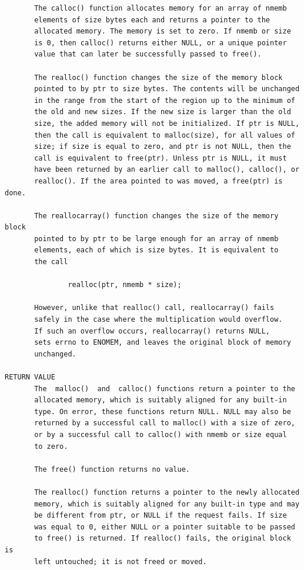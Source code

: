 {\begin{center}
\begin{verbatim}
       The calloc() function allocates memory for an array of nmemb
       elements of size bytes each and returns a pointer to the
       allocated memory. The memory is set to zero. If nmemb or size
       is 0, then calloc() returns either NULL, or a unique pointer
       value that can later be successfully passed to free().

       The realloc() function changes the size of the memory block
       pointed to by ptr to size bytes. The contents will be unchanged
       in the range from the start of the region up to the minimum of
       the old and new sizes. If the new size is larger than the old
       size, the added memory will not be initialized. If ptr is NULL,
       then the call is equivalent to malloc(size), for all values of
       size; if size is equal to zero, and ptr is not NULL, then the
       call is equivalent to free(ptr). Unless ptr is NULL, it must
       have been returned by an earlier call to malloc(), calloc(), or
       realloc(). If the area pointed to was moved, a free(ptr) is done.

       The reallocarray() function changes the size of the memory block
       pointed to by ptr to be large enough for an array of nmemb
       elements, each of which is size bytes. It is equivalent to
       the call

               realloc(ptr, nmemb * size);

       However, unlike that realloc() call, reallocarray() fails
       safely in the case where the multiplication would overflow.
       If such an overflow occurs, reallocarray() returns NULL,
       sets errno to ENOMEM, and leaves the original block of memory
       unchanged.

RETURN VALUE
       The  malloc()  and  calloc() functions return a pointer to the
       allocated memory, which is suitably aligned for any built-in
       type. On error, these functions return NULL. NULL may also be
       returned by a successful call to malloc() with a size of zero,
       or by a successful call to calloc() with nmemb or size equal
       to zero.

       The free() function returns no value.

       The realloc() function returns a pointer to the newly allocated
       memory, which is suitably aligned for any built-in type and may
       be different from ptr, or NULL if the request fails. If size
       was equal to 0, either NULL or a pointer suitable to be passed
       to free() is returned. If realloc() fails, the original block is
       left untouched; it is not freed or moved.


\end{verbatim}
\end{center}}

